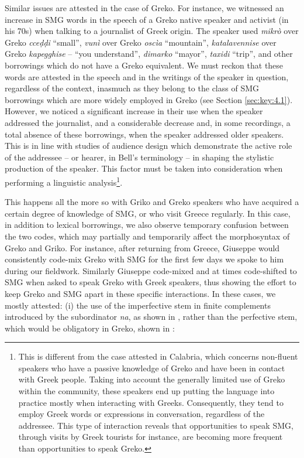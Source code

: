 \documentclass[output=paper,hidelinks]{langscibook}
\begin{document}
Similar issues are attested in the case of Greko. For instance, we witnessed an increase in SMG words in the speech of a Greko native speaker and activist (in his 70s) when talking to a journalist of Greek origin. The speaker used \textit{mikrò} over Greko \textit{cceḍḍi} ``small'', \textit{vunì} over Greko \textit{oscìa} ``mountain'', \textit{katalavennise} over Greko \textit{kapegghise} -- ``you understand'', \textit{dimarko} ``mayor'', \textit{taxidi} ``trip'', and other borrowings which do not have a Greko equivalent. We must reckon that these words are attested in the speech and in the writings of the speaker in question, regardless of the context, inasmuch as they belong to the class of SMG borrowings which are more widely employed in Greko (see Section \ref{sec:key:4.1}). However, we noticed a significant increase in their use when the speaker addressed the journalist, and a considerable decrease and, in some recordings, a total absence of these borrowings, when the speaker addressed older speakers. This is in line with studies of audience design which demonstrate the active role of the addressee -- or hearer, in Bell’s terminology \citep[144]{bell1984language, bell2001back} -- in shaping the stylistic production of the speaker. This factor must be taken into consideration when performing a linguistic analysis\footnote{This is different from the case attested in Calabria, which concerns non-fluent speakers who have a passive knowledge of Greko and have been in contact with Greek people. Taking into account the generally limited use of Greko within the community, these speakers end up putting the language into practice mostly when interacting with Greeks. Consequently, they tend to employ Greek words or expressions in conversation, regardless of the addressee. This type of interaction reveals that opportunities to speak SMG, through visits by Greek tourists for instance, are becoming more frequent than opportunities to speak Greko.}. 



This happens all the more so with Griko and Greko speakers who have acquired a certain degree of knowledge of SMG, or who visit Greece regularly. In this case, in addition to lexical borrowings, we also observe temporary confusion between the two codes, which may partially and temporarily affect the morphosyntax of Greko and Griko. For instance, after returning from Greece, Giuseppe would consistently code-mix Greko with SMG for the first few days we spoke to him during our fieldwork. Similarly Giuseppe code-mixed and at times code-shifted to SMG when asked to speak Greko with Greek speakers, thus showing the effort to keep Greko and SMG apart in these specific interactions. In these cases, we mostly attested: (i) the use of the imperfective stem in finite complements introduced by the subordinator \textit{na}, as shown in , rather than the perfective stem, which would be obligatory in Greko, shown in :
\end{document}
